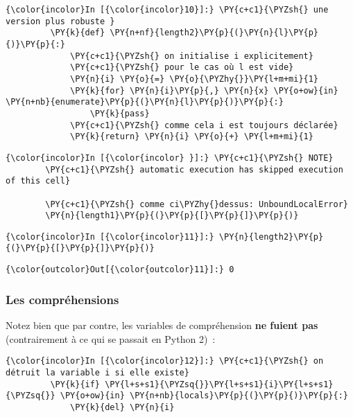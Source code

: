     \begin{Verbatim}[commandchars=\\\{\}]
{\color{incolor}In [{\color{incolor}10}]:} \PY{c+c1}{\PYZsh{} une version plus robuste }
         \PY{k}{def} \PY{n+nf}{length2}\PY{p}{(}\PY{n}{l}\PY{p}{)}\PY{p}{:}
             \PY{c+c1}{\PYZsh{} on initialise i explicitement}
             \PY{c+c1}{\PYZsh{} pour le cas où l est vide}
             \PY{n}{i} \PY{o}{=} \PY{o}{\PYZhy{}}\PY{l+m+mi}{1}
             \PY{k}{for} \PY{n}{i}\PY{p}{,} \PY{n}{x} \PY{o+ow}{in} \PY{n+nb}{enumerate}\PY{p}{(}\PY{n}{l}\PY{p}{)}\PY{p}{:}
                 \PY{k}{pass}
             \PY{c+c1}{\PYZsh{} comme cela i est toujours déclarée}
             \PY{k}{return} \PY{n}{i} \PY{o}{+} \PY{l+m+mi}{1}
\end{Verbatim}


    \begin{Verbatim}[commandchars=\\\{\}]
{\color{incolor}In [{\color{incolor} }]:} \PY{c+c1}{\PYZsh{} NOTE}
        \PY{c+c1}{\PYZsh{} automatic execution has skipped execution of this cell}
        
        \PY{c+c1}{\PYZsh{} comme ci\PYZhy{}dessus: UnboundLocalError}
        \PY{n}{length1}\PY{p}{(}\PY{p}{[}\PY{p}{]}\PY{p}{)}
\end{Verbatim}


    \begin{Verbatim}[commandchars=\\\{\}]
{\color{incolor}In [{\color{incolor}11}]:} \PY{n}{length2}\PY{p}{(}\PY{p}{[}\PY{p}{]}\PY{p}{)}
\end{Verbatim}


\begin{Verbatim}[commandchars=\\\{\}]
{\color{outcolor}Out[{\color{outcolor}11}]:} 0
\end{Verbatim}
            
    \hypertarget{les-compruxe9hensions}{%
\subsubsection{Les compréhensions}\label{les-compruxe9hensions}}

    Notez bien que par contre, les variables de compréhension \textbf{ne
fuient pas} (contrairement à ce qui se passait en Python 2)~:

    \begin{Verbatim}[commandchars=\\\{\}]
{\color{incolor}In [{\color{incolor}12}]:} \PY{c+c1}{\PYZsh{} on détruit la variable i si elle existe}
         \PY{k}{if} \PY{l+s+s1}{\PYZsq{}}\PY{l+s+s1}{i}\PY{l+s+s1}{\PYZsq{}} \PY{o+ow}{in} \PY{n+nb}{locals}\PY{p}{(}\PY{p}{)}\PY{p}{:} 
             \PY{k}{del} \PY{n}{i}   
\end{Verbatim}


